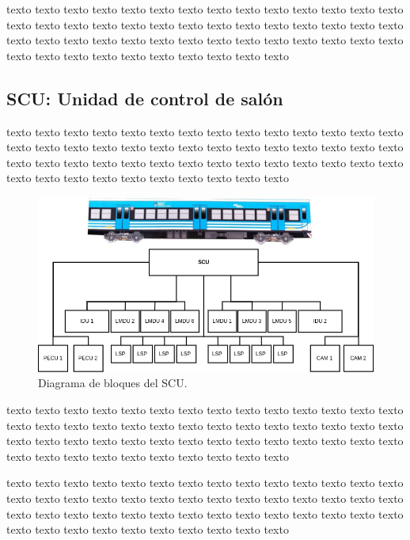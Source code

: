 \documentclass[
11pt, %
]{charter}
\begin{document}
texto texto texto texto texto texto texto texto texto texto texto texto texto texto texto texto texto texto texto texto texto texto texto texto texto texto texto texto texto texto texto texto texto texto texto texto texto texto texto texto texto texto texto texto texto texto texto texto texto texto texto texto 


\pagebreak
\subsection{SCU: Unidad de control de salón}

texto texto texto texto texto texto texto texto texto texto texto texto texto texto texto texto texto texto texto texto texto texto texto texto texto texto texto texto texto texto texto texto texto texto texto texto texto texto texto texto texto texto texto texto texto texto texto texto texto texto texto texto 


\begin{figure}[htpb]
\centering 
\includegraphics[width=1\textwidth]{./Pics/diagramaSCU.png}
\caption{Diagrama de bloques del SCU.}
\label{fig:diagrama SCU}
\end{figure}

texto texto texto texto texto texto texto texto texto texto texto texto texto texto texto texto texto texto texto texto texto texto texto texto texto texto texto texto texto texto texto texto texto texto texto texto texto texto texto texto texto texto texto texto texto texto texto texto texto texto texto texto 


texto texto texto texto texto texto texto texto texto texto texto texto texto texto texto texto texto texto texto texto texto texto texto texto texto texto texto texto texto texto texto texto texto texto texto texto texto texto texto texto texto texto texto texto texto texto texto texto texto texto texto texto 
\end{document}
